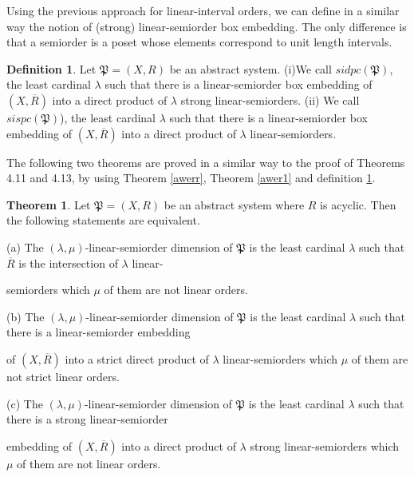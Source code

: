 \documentclass{article}
\theoremstyle{definition}
\newtheorem{definition}{Definition}[section]
\newtheorem{theorem}{Theorem}[section]
\begin{document}
Using the previous approach for linear-interval orders,
we can define in a similar way the notion of 
(strong) linear-semiorder box embedding. The only difference is that
a semiorder is a poset whose elements correspond to unit length intervals.






\begin{definition}\label{au127}{\rm Let $\mathfrak{P} = (X, R)$ be an abstract system. (i)We call $sidpc(\mathfrak{P})$, the least cardinal $\lambda$ such that there is a linear-semiorder box embedding of $(X,\overline{R})$ into a direct product of $\lambda$ strong linear-semiorders.
(ii) 
We call $sispc(\mathfrak{P})$), the least cardinal $\lambda$ such that there is a linear-semiorder box embedding of $(X,\overline{R})$ into a direct product of $\lambda$ linear-semiorders.
}
\end{definition}



The following two theorems are proved in a similar way to the proof of Theorems
4.11 and 4.13, by using Theorem \ref{awerr}, Theorem \ref{awer1} and definition \ref{au127}.











\begin{theorem}\label{aw128} Let $\mathfrak{P}=(X,R)$ be an abstract system where $R$ is acyclic. Then the following statements are equivalent.
\par\noindent
(a) The $(\lambda,\mu)$-linear-semiorder dimension of $\mathfrak{P}$ is the least cardinal $\lambda$ such that $\overline{R}$ is the intersection of $\lambda$ linear-
\par
\!\!\! \!\!
semiorders which $\mu$ of them are not linear orders.
\par\noindent
(b) The $(\lambda,\mu)$-linear-semiorder dimension of $\mathfrak{P}$
is the least cardinal $\lambda$ such that there is a linear-semiorder embedding 
\par
\!\!\! \!\!
of $(X,\overline{R})$ into a strict direct product of $\lambda$ linear-semiorders
which $\mu$ of them are not strict linear orders.
\par\noindent
(c) The $(\lambda,\mu)$-linear-semiorder dimension of $\mathfrak{P}$
is the least cardinal $\lambda$ such that there is a strong linear-semiorder 
\par
\!\!\! \!\!
embedding of $(X,\overline{R})$ into a direct product of $\lambda$ strong linear-semiorders which $\mu$ of them are not linear
orders.
\end{theorem}
\end{document}

